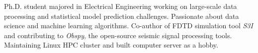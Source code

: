 

\begin{cvparagraph}

Ph.D. student majored in Electrical Engineering working on large-scale data processing and statistical model prediction challenges. Passionate about data science and machine learning algorithms. Co-author of FDTD simulation tool \textit{S3I} and contributing to \textit{Obspy}, the open-source seismic signal processing tools. Maintaining Linux HPC cluster and built computer server as a hobby.
\end{cvparagraph}
